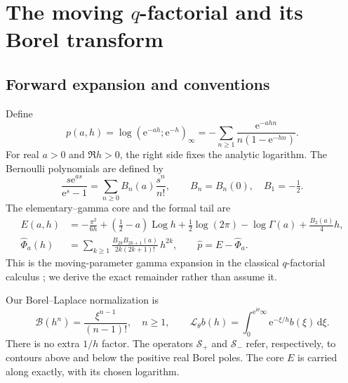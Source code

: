 \documentclass[11pt,a4paper]{article}
\numberwithin{equation}{section}
\theoremstyle{definition}
\theoremstyle{remark}\newtheorem{remark}[theorem]{Remark}
\newcommand{\ii}{\mathrm i}\newcommand{\e}{\mathrm e}
\newcommand{\dd}{\,\mathrm d}\newcommand{\id}{\operatorname{id}}
\newcommand{\Log}{\operatorname{Log}}\newcommand{\Li}{\operatorname{Li}}
\newcommand{\Borel}{\mathcal B}\newcommand{\Lap}{\mathcal L}
\newcommand{\Sp}{\mathcal S_{+}}\newcommand{\Sm}{\mathcal S_{-}}
\begin{document}
\section{The moving \texorpdfstring{$q$}{q}-factorial and its Borel transform}
\label{sec:borel}

\subsection{Forward expansion and conventions}
Define
\begin{equation}\label{eq:p-def}
 p(a,h)=\log(\e^{-ah};\e^{-h})_\infty
       =-\sum_{n\ge1}\frac{\e^{-ahn}}{n(1-\e^{-hn})}.
\end{equation}
For real $a>0$ and $\Re h>0$, the right side fixes the analytic logarithm.
The Bernoulli polynomials are defined by
\[
 \frac{s\e^{as}}{\e^s-1}=\sum_{n\ge0}B_n(a)\frac{s^n}{n!},
 \qquad B_n=B_n(0),\quad B_1=-\tfrac12.
\]
The elementary--gamma core and the formal tail are
\begin{align}
 E(a,h)&=-\frac{\pi^2}{6h}+
  \left(\frac12-a\right)\Log h+\frac12\log(2\pi)-\log\Gamma(a)
  +\frac{B_2(a)}4h,\label{eq:E}\\
 \widehat\Phi_a(h)&=\sum_{k\ge1}
 \frac{B_{2k}B_{2k+1}(a)}{2k(2k+1)!}\,h^{2k},
 \qquad \widehat p=E-\widehat\Phi_a.\label{eq:Phi}
\end{align}
This is the moving-parameter gamma expansion in the classical
$q$-factorial calculus \cite{mcintosh,ar}; we derive the exact remainder
rather than assume it.

Our Borel--Laplace normalization is
\begin{equation}\label{eq:borel-convention}
 \Borel(h^n)=\frac{\xi^{n-1}}{(n-1)!},\quad n\ge1,
 \qquad
 \Lap_\theta b(h)=\int_0^{\e^{\ii\theta}\infty}
            \e^{-\xi/h}b(\xi)\dd\xi.
\end{equation}
There is no extra $1/h$ factor. The operators $\Sp$ and $\Sm$ refer,
respectively, to contours above and below the positive real Borel poles.
The core $E$ is carried along exactly, with its chosen logarithm.
\end{document}
